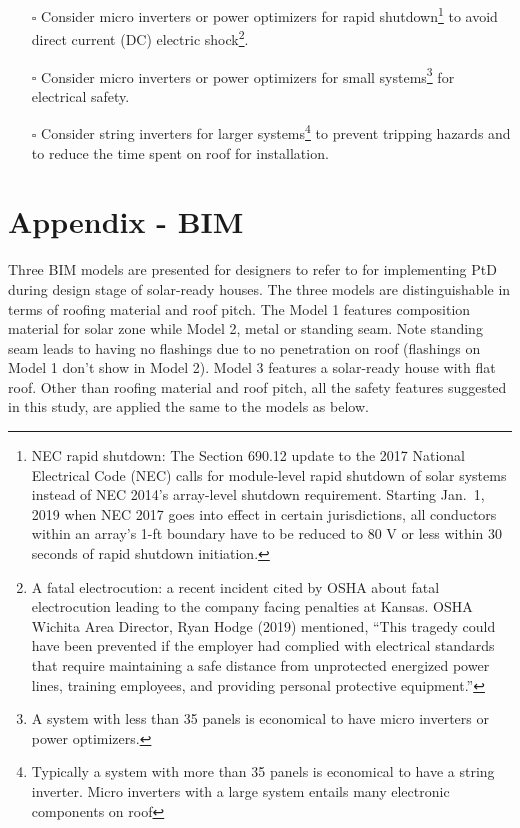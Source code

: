 \documentclass[]{article}
\providecommand{\tightlist}{%
  \setlength{\itemsep}{0pt}\setlength{\parskip}{0pt}}
\let\rmarkdownfootnote\footnote%
\def\footnote{\protect\rmarkdownfootnote}
\begin{document}
\begin{itemize}
\tightlist
\item[$\square$]
  Consider micro inverters or power optimizers for rapid
  shutdown\footnote{NEC rapid shutdown: The Section 690.12 update to the
    2017 National Electrical Code (NEC) calls for module-level rapid
    shutdown of solar systems instead of NEC 2014's array-level shutdown
    requirement. Starting Jan.~1, 2019 when NEC 2017 goes into effect in
    certain jurisdictions, all conductors within an array's 1-ft
    boundary have to be reduced to 80 V or less within 30 seconds of
    rapid shutdown initiation.} to avoid direct current (DC) electric
  shock\footnote{A fatal electrocution: a recent incident cited by OSHA
    about fatal electrocution leading to the company facing penalties at
    Kansas. OSHA Wichita Area Director, Ryan Hodge (2019) mentioned,
    ``This tragedy could have been prevented if the employer had
    complied with electrical standards that require maintaining a safe
    distance from unprotected energized power lines, training employees,
    and providing personal protective equipment.''}.
\item[$\square$]
  Consider micro inverters or power optimizers for small
  systems\footnote{A system with less than 35 panels is economical to
    have micro inverters or power optimizers.} for electrical safety.
\item[$\square$]
  Consider string inverters for larger systems\footnote{Typically a
    system with more than 35 panels is economical to have a string
    inverter. Micro inverters with a large system entails many
    electronic components on roof} to prevent tripping hazards and to
  reduce the time spent on roof for installation.
\end{itemize}

\hypertarget{appendix---bim}{%
\section{Appendix - BIM}\label{appendix---bim}}

Three BIM models are presented for designers to refer to for
implementing PtD during design stage of solar-ready houses. The three
models are distinguishable in terms of roofing material and roof pitch.
The Model 1 features composition material for solar zone while Model 2,
metal or standing seam. Note standing seam leads to having no flashings
due to no penetration on roof (flashings on Model 1 don't show in Model
2). Model 3 features a solar-ready house with flat roof. Other than
roofing material and roof pitch, all the safety features suggested in
this study, are applied the same to the models as below.
\end{document}
